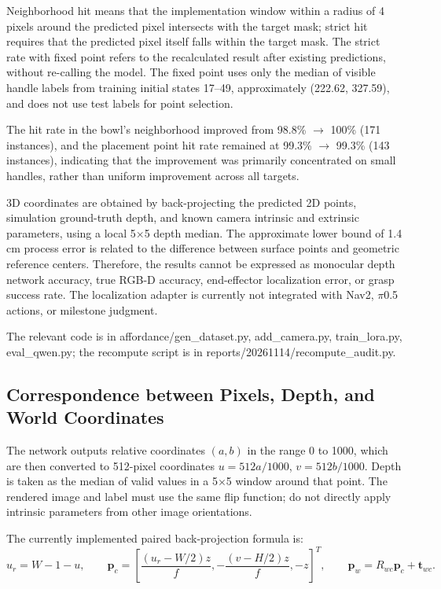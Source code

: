 Neighborhood hit means that the implementation window within a radius of 4 pixels around the predicted pixel intersects with the target mask; strict hit requires that the predicted pixel itself falls within the target mask. The strict rate with fixed point refers to the recalculated result after existing predictions, without re-calling the model. The fixed point uses only the median of visible handle labels from training initial states 17--49, approximately (222.62, 327.59), and does not use test labels for point selection.

The hit rate in the bowl's neighborhood improved from 98.8\% \(\rightarrow\) 100\% (171 instances), and the placement point hit rate remained at 99.3\% \(\rightarrow\) 99.3\% (143 instances), indicating that the improvement was primarily concentrated on small handles, rather than uniform improvement across all targets.

3D coordinates are obtained by back-projecting the predicted 2D points, simulation ground-truth depth, and known camera intrinsic and extrinsic parameters, using a local 5\(\times\)5 depth median. The approximate lower bound of 1.4 cm process error is related to the difference between surface points and geometric reference centers. Therefore, the results cannot be expressed as monocular depth network accuracy, true RGB-D accuracy, end-effector localization error, or grasp success rate. The localization adapter is currently not integrated with Nav2, \(\pi\)0.5 actions, or milestone judgment.

The relevant code is in affordance/gen\_dataset.py, add\_camera.py, train\_lora.py, eval\_qwen.py; the recompute script is in reports/20261114/recompute\_audit.py.


\subsection{Correspondence between Pixels, Depth, and World Coordinates}\label{s17-detail-3}

The network outputs relative coordinates \((a,b)\) in the range 0 to 1000, which are then converted to 512-pixel coordinates \(u=512a/1000\), \(v=512b/1000\). Depth is taken as the median of valid values in a 5\(\times\)5 window around that point. The rendered image and label must use the same flip function; do not directly apply intrinsic parameters from other image orientations.

The currently implemented paired back-projection formula is: \[u_r=W-1-u,\qquad
 \boldsymbol p_c=\left[\frac{(u_r-W/2)z}{f},-\frac{(v-H/2)z}{f},-z\right]^T,
 \qquad\boldsymbol p_w=R_{wc}\boldsymbol p_c+\boldsymbol t_{wc}.\]

